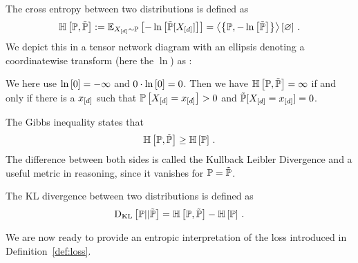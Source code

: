 \begin{definition}\label{def:crossEntropy}
	The cross entropy between two distributions is defined as 
		\[ \mathbb{H}\left[\mathbb{P},\tilde{\mathbb{P}}\right] 
		:=  \mathbb{E}_{X_{[d]}\sim\mathbb{P}}\left[-\ln \left[ \tilde{\mathbb{P}}[X_{[d]}] \right]\right] 
		= \left\langle \left\{\mathbb{P},-\ln \left[ \tilde{\mathbb{P}} \right]\right\}\right\rangle \left[ \varnothing \right] \, . \]
	We depict this in a tensor network diagram with an ellipsis denoting a coordinatewise transform (here the $\ln$) as :
	\begin{center}
		
	\end{center}
\end{definition}

We here use $\ln \left[ 0 \right]=-\infty$ and $0\cdot \ln \left[ 0 \right] = 0$. 
Then we have $\mathbb{H}\left[\mathbb{P},\tilde{\mathbb{P}}\right] = \infty$ if and only if there is a $x_{[d]}$ such that $\mathbb{P}\left[X_{[d]}=x_{[d]}\right]>0$ and $\tilde{\mathbb{P}}[X_{[d]}=x_{[d]}]=0$.


The Gibbs inequality states that
		\[ \mathbb{H}\left[\mathbb{P},\tilde{\mathbb{P}}\right] \geq \mathbb{H}\left[\mathbb{P}\right] \, . \]
The difference between both sides is called the Kullback Leibler Divergence and a useful metric in reasoning, since it vanishes for $\mathbb{P}=\tilde{\mathbb{P}}$.

\begin{definition}\label{def:KLDivergence}
	The KL divergence between two distributions is defined as 
		\[ \mathrm{D}_{\mathrm{KL}}\left[ \mathbb{P} || \tilde{\mathbb{P}} \right] = \mathbb{H}\left[\mathbb{P},\tilde{\mathbb{P}}\right] - \mathbb{H}\left[\mathbb{P}\right]  \, . \]
\end{definition}

We are now ready to provide an entropic interpretation of the loss introduced in Definition~\ref{def:loss}.

